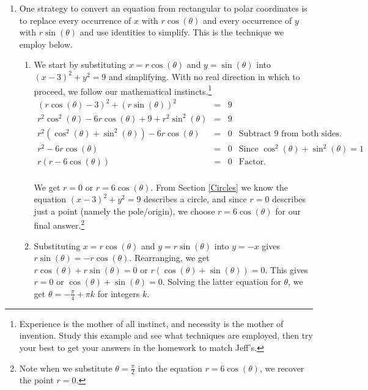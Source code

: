 \documentclass{ximera}
\begin{document}
\begin{example}
\begin{explanation}
\begin{enumerate}

\item  One strategy to convert an equation from rectangular to polar coordinates is to replace every occurrence of $x$ with $r\cos(\theta)$ and every occurrence of $y$ with $r\sin(\theta)$ and use identities to simplify.  This is the technique we employ below.

\begin{enumerate}

\item We start by substituting  $x = r\cos(\theta)$ and $y = \sin(\theta)$ into $(x-3)^2 + y^2 = 9$ and simplifying.  With no real direction in which to proceed, we follow our mathematical instincts.\footnote{Experience is the mother of all instinct, and necessity is the mother of invention.  Study this example and see what techniques are employed, then try your best to get your answers in the homework to match Jeff's.}
\[ \begin{array}{rclr}

(r\cos(\theta) - 3)^2+ (r\sin(\theta))^2 & = & 9& \\
r^2\cos^2(\theta) - 6 r\cos(\theta) + 9 + r^2 \sin^{2}(\theta) & = &  9 \\
r^2\left(\cos^2(\theta) + \sin^{2}(\theta)\right) - 6 r\cos(\theta) & = & 0 & \text{Subtract $9$ from both sides.}\\
r^2 - 6 r\cos(\theta) & = & 0 & \text{Since $\cos^2(\theta) + \sin^2(\theta) = 1$} \\
r(r - 6 \cos(\theta)) & = & 0 &  \text{Factor.} \\ \end{array} \]

We get $r = 0$ or $r = 6\cos(\theta)$.  From Section \ref{Circles} we know the equation $(x-3)^2 + y^2 = 9$ describes a circle, and since $r=0$ describes just a point (namely the pole/origin), we choose $r = 6\cos(\theta)$ for our final answer.\footnote{Note when we substitute $\theta = \frac{\pi}{2}$ into the equation $r = 6\cos(\theta)$,  we recover the point $r = 0$.}

\item  Substituting $x = r\cos(\theta)$ and $y = r\sin(\theta)$ into $y=-x$ gives $r\sin(\theta)= -r\cos(\theta)$.  Rearranging, we get  $r\cos(\theta) + r\sin(\theta) = 0$ or $r(\cos(\theta) + \sin(\theta)) = 0$.  This gives $r=0$ or $\cos(\theta) + \sin(\theta) = 0$.  Solving the latter equation for $\theta$, we get $\theta = -\frac{\pi}{4} + \pi k$ for integers $k$. 


\end{enumerate}
\end{enumerate}
\end{explanation}
\end{example}
\end{document}
